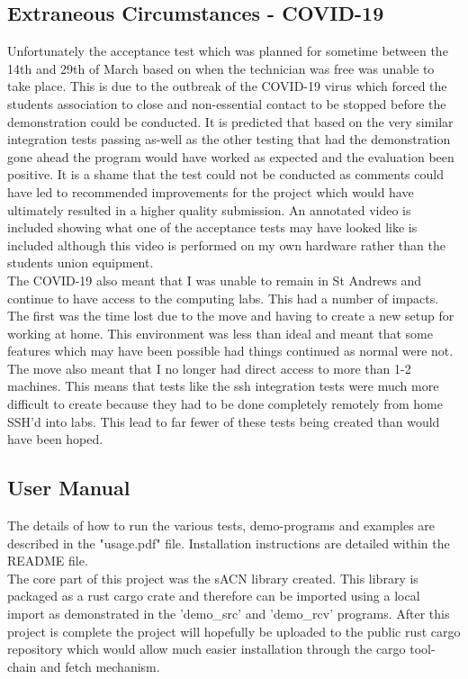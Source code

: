 \documentclass[11pt,a4paper]{article}
\begin{document}
\subsection{Extraneous Circumstances - COVID-19}
Unfortunately the acceptance test which was planned for sometime between the 14th and 29th of March based on when the technician was free was unable to take place. This is due to the outbreak of the COVID-19 virus which forced the students association to close and non-essential contact to be stopped before the demonstration could be conducted. It is predicted that based on the very similar integration tests passing as-well as the other testing that had the demonstration gone ahead the program would have worked as expected and the evaluation been positive. It is a shame that the test could not be conducted as comments could have led to recommended improvements for the project which would have ultimately resulted in a higher quality submission. An annotated video is included showing what one of the acceptance tests may have looked like is included although this video is performed on my own hardware rather than the students union equipment.\\

The COVID-19 also meant that I was unable to remain in St Andrews and continue to have access to the computing labs. This had a number of impacts. The first was the time lost due to the move and having to create a new setup for working at home. This environment was less than ideal and meant that some features which may have been possible had things continued as normal were not. The move also meant that I no longer had direct access to more than 1-2 machines. This means that tests like the ssh integration tests were much more difficult to create because they had to be done completely remotely from home SSH'd into labs. This lead to far fewer of these tests being created than would have been hoped. \\

\subsection{User Manual}
The details of how to run the various tests, demo-programs and examples are described in the "usage.pdf" file. Installation instructions are detailed within the README file.\\

The core part of this project was the sACN library created. This library is packaged as a rust cargo crate and therefore can be imported using a local import as demonstrated in the 'demo\_src' and 'demo\_rcv' programs. After this project is complete the project will hopefully be uploaded to the public rust cargo repository which would allow much easier installation through the cargo tool-chain and fetch mechanism.\\
\end{document}
